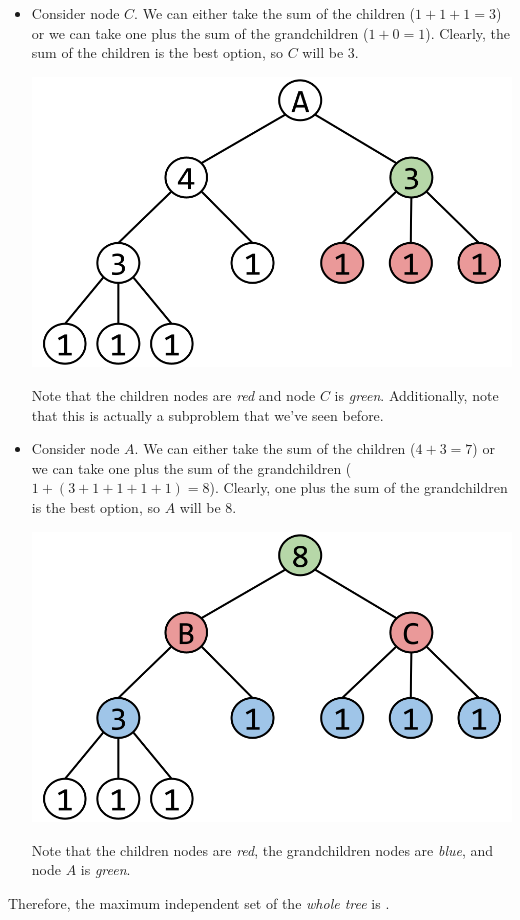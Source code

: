 \documentclass[letterpaper]{article}
\begin{document}
\begin{mdframed}[]
\begin{itemize}
        \item Consider node $C$. We can either take the sum of the children ($1 + 1 + 1 = 3$) or we can take one plus the sum of the grandchildren ($1 + 0 = 1$). Clearly, the sum of the children is the best option, so $C$ will be 3. 
        \begin{center}
            \includegraphics[scale=0.2]{../assets/indep_set_ex_4.png}
        \end{center}
        Note that the children nodes are \emph{red} and node $C$ is \emph{green}. Additionally, note that this is actually a subproblem that we've seen before.

        \item Consider node $A$. We can either take the sum of the children ($4 + 3 = 7$) or we can take one plus the sum of the grandchildren ($1 + (3 + 1 + 1 + 1 + 1) = 8$). Clearly, one plus the sum of the grandchildren is the best option, so $A$ will be 8. 
        \begin{center}
            \includegraphics[scale=0.2]{../assets/indep_set_ex_5.png}
        \end{center}
        Note that the children nodes are \emph{red}, the grandchildren nodes are \emph{blue}, and node $A$ is \emph{green}.
    \end{itemize}
    Therefore, the maximum independent set of the \emph{whole tree} is .
\end{mdframed}
\end{document}
